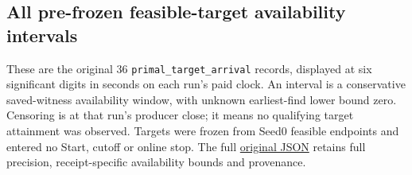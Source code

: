 \documentclass[
  american,
  11pt,
]{article}
\begin{document}
\begin{landscape}

\subsection{All pre-frozen feasible-target availability
intervals}\label{all-pre-frozen-feasible-target-availability-intervals}

These are the original 36
\texttt{primal\_\allowbreak{}target\_\allowbreak{}arrival} records, displayed at
six significant digits in seconds on each run's paid clock. An interval
is a conservative saved-witness availability window, with unknown
earliest-find lower bound zero. Censoring is at that run's producer
close; it means no qualifying target attainment was observed. Targets
were frozen from Seed0 feasible endpoints and entered no Start, cutoff
or online stop. The full
\href{https://github.com/yifanXovo/TailoredExact/blob/codex/round172-journal-manuscript/results/unified_exact_round164/reports/primal_target_arrival.json}{original
JSON} retains full precision, receipt-specific availability bounds and
provenance.


\end{landscape}
\end{document}
